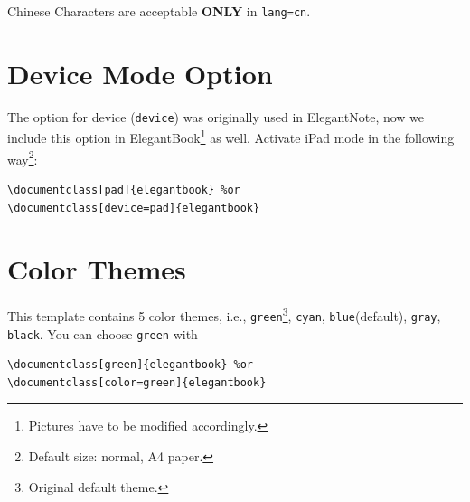 \documentclass[11pt,bibend=bibtex]{elegantbook}
\begin{document}
\begin{remark}
Chinese Characters  are acceptable \textbf{ONLY} in \lstinline{lang=cn}.
\end{remark}

\section{Device Mode Option}
The option for device (\lstinline{device}) was originally used in ElegantNote, now we include this option in ElegantBook\footnote{Pictures have to be modified accordingly.} as well. Activate iPad mode in the following way\footnote{Default size: normal, A4 paper.}:
\begin{lstlisting}
\documentclass[pad]{elegantbook} %or
\documentclass[device=pad]{elegantbook}
\end{lstlisting}

\section{Color Themes}
This template contains 5 color themes, i.e., \textcolor{structure1}{\lstinline{green}}\footnote{Original default theme.}, \textcolor{structure2}{\lstinline{cyan}}, \textcolor{structure3}{\lstinline{blue}}(default), \textcolor{structure4}{\lstinline{gray}}, \textcolor{structure5}{\lstinline{black}}. You can choose \lstinline{green} with
\begin{lstlisting}
\documentclass[green]{elegantbook} %or
\documentclass[color=green]{elegantbook}
\end{lstlisting}
\end{document}
